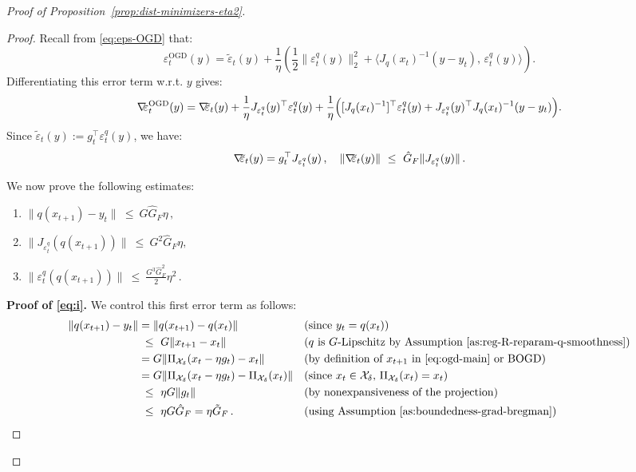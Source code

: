 \documentclass[a4paper,11pt,fullpage]{article}
\def\X{{\mathcal X}}
\theoremstyle{plain}
\theoremstyle{definition}
\theoremstyle{plain}
\renewcommand{\leq}{~\le~}
\let\nablaold\nabla
\renewcommand{\nabla}{\nablaold\mkern-2.5mu}
\begin{document}
\begin{proof}[Proof of Proposition~\ref{prop:dist-minimizers-eta2}]
\begin{proof}
Recall from \eqref{eq:eps-OGD} that: 
\[
\varepsilon_t^{\mathrm{OGD}}(y)
=
\tilde\varepsilon_t(y)
+
\frac1\eta
\left(
\frac12\|\varepsilon_t^q(y)\|_2^2
+
\big\langle J_q(x_t)^{-1}(y-y_t),\,\varepsilon_t^q(y)\big\rangle
\right).
\]
Differentiating this error term w.r.t. $y$ gives: 
\begin{equation}
\label{eq:grad-eps-OGD}
\nabla\varepsilon_t^{\mathrm{OGD}}(y)
=
\nabla \tilde\varepsilon_t(y)
+
\frac1\eta J_{\varepsilon_t^q}(y)^\top \varepsilon_t^q(y)
+
\frac1\eta\Big(
[J_q(x_t)^{-1}]^\top \varepsilon_t^q(y)
+
J_{\varepsilon_t^q}(y)^\top J_q(x_t)^{-1}(y-y_t)
\Big).
\end{equation}
Since $\tilde\varepsilon_t(y) := g_t^\top \varepsilon_t^q(y)$, we have: 
\begin{equation*}
\nabla \tilde\varepsilon_t(y)
=
g_t^\top J_{\varepsilon_t^q}(y)\,, \quad \|\nabla \tilde\varepsilon_t(y)\| \leq \hat{G}_F \|J_{\varepsilon_t^q}(y)\|\,.
\end{equation*}

We now prove the following estimates: 
\begin{enumerate}[label=(\roman*)]
\item \label{eq:i} $\|q(x_{t+1})-y_t\| \leq  G \hat{G}_F \eta\,,$
\item \label{eq:ii} $\|J_{\varepsilon_t^q}(q(x_{t+1}))\| \leq  G^2 \hat{G}_F \eta,$
\item \label{eq:iii} $\|\varepsilon_t^q(q(x_{t+1}))\| \leq \frac{G^3 \hat{G}_F^2}{2} \eta^2\,.$ 
\end{enumerate}

\noindent\textbf{Proof of \ref{eq:i}.}  We control this first error term as follows: 
\begin{align}
\|q(x_{t+1})-y_t\|
&= \|q(x_{t+1})-q(x_t)\|
&&\hfill \text{(since $y_t = q(x_t)$)}  \nonumber\\
&\leq G \|x_{t+1} - x_t\|
&&\hfill \text{($q$ is $G$-Lipschitz by Assumption~\ref{as:reg-R-reparam-q-smoothness})} \nonumber\\
&= G\|\Pi_{\X_{\delta}}(x_t-\eta g_t) - x_t\|
&&\hfill \text{(by definition of $x_{t+1}$ in \eqref{eq:ogd-main} or BOGD)} \nonumber\\
&= G \|\Pi_{\X_{\delta}}(x_t-\eta g_t) - \Pi_{\X_{\delta}}(x_t)\|
&&\hfill \text{(since $x_t\in\X_{\delta}$, $\Pi_{\X_{\delta}}(x_t)=x_t$)} \nonumber\\
&\leq \eta G \|g_t\| 
&&\hfill \text{(by nonexpansiveness of the projection)} \nonumber\\
&\leq \eta G \hat{G}_F = \eta \tilde{G}_F \,.
&&\hfill \text{(using Assumption~\ref{as:boundedness-grad-bregman})}
\end{align}


\end{proof}
\end{proof}
\end{document}
